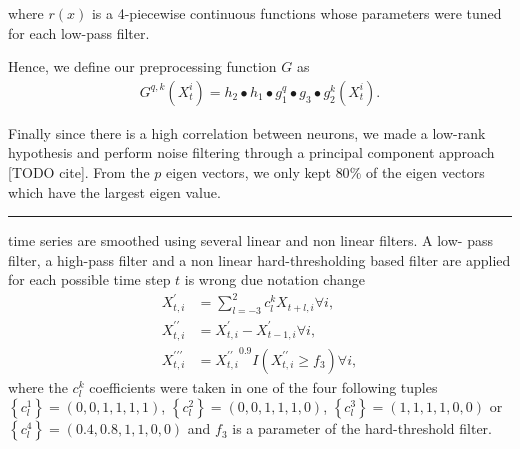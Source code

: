 \documentclass[wcp]{jmlr}
\begin{document}
where $r(x)$ is a 4-piecewise continuous functions whose parameters were tuned
for each low-pass filter.


Hence, we define our preprocessing function $G$ as 
\begin{align}
G^{q,k}(X_t^i) = h_2 \bullet h_1 \bullet g^q_1 \bullet g_3 \bullet g_2^k(X_t^i).
\end{align}

Finally since there is a high correlation between neurons, we made a
low-rank hypothesis and perform noise filtering through a principal component
approach [TODO cite]. From the $p$ eigen vectors, we only kept $80\%$ of
the eigen vectors which have the largest eigen value.

\vspace{1em}
\hrule
\vspace{1em}

time series are smoothed using several linear and non linear filters. A low-
pass filter, a high-pass filter and a non linear hard-thresholding based
filter are applied for each possible time step $t$ %
is wrong due notation change \begin{align} X^\prime_{t,i} &= \sum_{l=-3}^2
c_l^k X_{t+l,i} \forall i, \\ X^{\prime\prime}_{t,i} &= X^{\prime}_{t,i} -
X^{\prime}_{t-1,i} \forall i, \\ X^{\prime\prime\prime}_{t,i} &=
{X^{\prime\prime}_{t,i}}^{0.9} I(X^{\prime\prime}_{t,i} \geq f_3) \forall i,
\end{align} where the $c_l^k$ coefficients were taken in one of the four
following tuples $\left\{c_l^1\right\}=(0, 0, 1, 1, 1, 1)$,
$\left\{c_l^2\right\}=(0, 0, 1, 1, 1, 0)$, $\left\{c_l^3\right\}=(1, 1, 1, 1,
0, 0)$ or $\left\{c_l^4\right\}=(0.4, 0.8, 1, 1, 0, 0)$ and $f_3$ is a
parameter of the hard-threshold filter.
\end{document}

